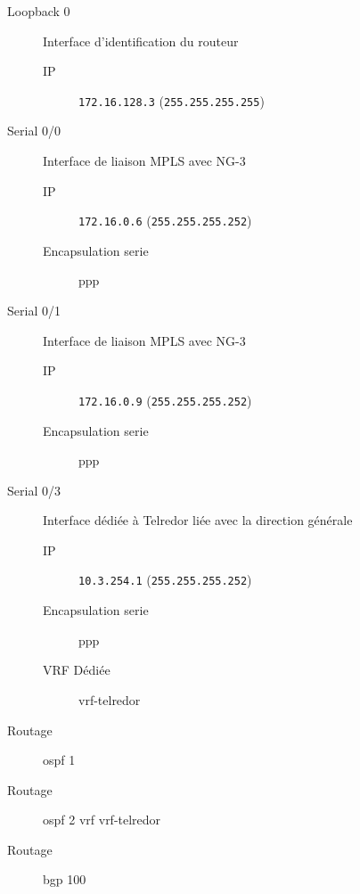 	\begin{description}
		\item[Loopback 0] Interface d'identification du routeur
		\begin{description}
			\item[IP] \texttt{172.16.128.3} (\texttt{255.255.255.255})
		\end{description}

		\item[Serial 0/0] Interface de liaison MPLS avec NG-3
		\begin{description}
			\item[IP] \texttt{172.16.0.6} (\texttt{255.255.255.252})
			\item[Encapsulation serie] ppp
		\end{description}

		\item[Serial 0/1] Interface de liaison MPLS avec NG-3
		\begin{description}
			\item[IP] \texttt{172.16.0.9} (\texttt{255.255.255.252})
			\item[Encapsulation serie] ppp
		\end{description}

		\item[Serial 0/3] Interface dédiée à Telredor liée avec la direction générale
		\begin{description}
			\item[IP] \texttt{10.3.254.1} (\texttt{255.255.255.252})
			\item[Encapsulation serie] ppp
			\item[VRF Dédiée] vrf-telredor
		\end{description}

		\item[Routage] ospf 1
		\item[Routage] ospf 2 vrf vrf-telredor
		\item[Routage] bgp 100
	\end{description}
